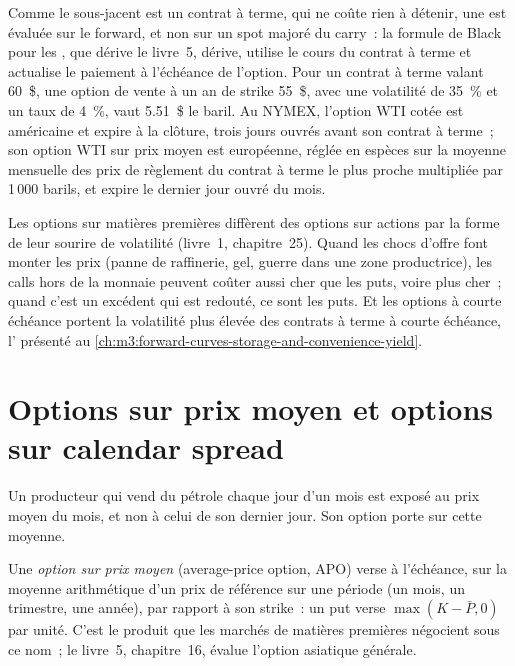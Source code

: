 Comme le sous-jacent est un contrat à terme, qui ne coûte rien à détenir, une  est évaluée sur le
forward, et non sur un spot majoré du carry~: la formule de Black pour les , que dérive le livre~5,
dérive, utilise le cours du contrat à terme et actualise le paiement à l'échéance de l'option. Pour un contrat à terme valant 60~\$,
une option de vente à un an de strike 55~\$, avec une volatilité de 35~\% et un taux de 4~\%, vaut 5.51~\$ le baril. Au NYMEX,
l'option WTI cotée est américaine et expire à la clôture, trois jours ouvrés avant son contrat à terme~; son option WTI
sur prix moyen est européenne, réglée en espèces sur la moyenne mensuelle des prix de règlement du contrat à terme le plus proche
multipliée par 1\,000 barils, et expire le dernier jour ouvré du mois.

Les options sur matières premières diffèrent des options sur actions par la forme de leur sourire de volatilité (livre~1,
chapitre~25). Quand les chocs d'offre font monter les prix (panne de raffinerie, gel, guerre dans une zone productrice),
les calls hors de la monnaie peuvent coûter aussi cher que les puts, voire plus cher~; quand c'est un excédent qui est redouté, ce sont les puts.
Et les options à courte échéance portent la volatilité plus élevée des contrats à terme à courte échéance, l'
présenté au \cref{ch:m3:forward-curves-storage-and-convenience-yield}.

\section{Options sur prix moyen et options sur calendar spread}

Un producteur qui vend du pétrole chaque jour d'un mois est exposé au prix moyen du mois, et non à celui de son dernier
jour. Son option porte sur cette moyenne.

\begin{definition}\label{def:m3:commodity-options-and-structured-hedges:apo}
Une \emph{option sur prix moyen} (average-price option, APO) verse à l'échéance, sur la moyenne arithmétique
d'un prix de référence sur une période (un mois, un trimestre, une année), par rapport à son strike~: un put
verse $\max(K - \bar P, 0)$ par unité. C'est le produit que les marchés de matières premières négocient sous ce nom~; le
livre~5, chapitre~16, évalue l'option asiatique générale.
\end{definition}

